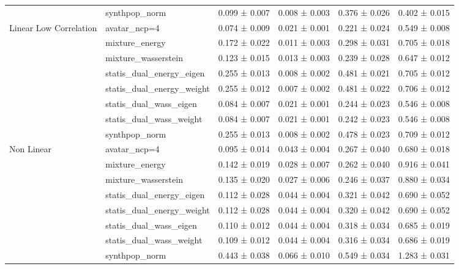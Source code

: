 \begin{tabular}{llllll}
 & synthpop_norm & \cellcolor{myred}0.099 ± 0.007 & \cellcolor{myred}0.008 ± 0.003 & \cellcolor{myred}0.376 ± 0.026 & \cellcolor{myred}0.402 ± 0.015 \\
\cline{1-6}
\multirow[t]{8}{*}{Linear 
 Low Correlation} & avatar_ncp=4 & \cellcolor{mygreen}0.074 ± 0.009 & \cellcolor{myred}0.021 ± 0.001 & \cellcolor{mygreen}0.221 ± 0.024 & 0.549 ± 0.008 \\
 & mixture_energy & 0.172 ± 0.022 & 0.011 ± 0.003 & 0.298 ± 0.031 & 0.705 ± 0.018 \\
 & mixture_wasserstein & 0.123 ± 0.015 & 0.013 ± 0.003 & 0.239 ± 0.028 & 0.647 ± 0.012 \\
 & statis_dual_energy_eigen & \cellcolor{myred}0.255 ± 0.013 & 0.008 ± 0.002 & \cellcolor{myred}0.481 ± 0.021 & 0.705 ± 0.012 \\
 & statis_dual_energy_weight & \cellcolor{myred}0.255 ± 0.012 & \cellcolor{mygreen}0.007 ± 0.002 & \cellcolor{myred}0.481 ± 0.022 & 0.706 ± 0.012 \\
 & statis_dual_wass_eigen & 0.084 ± 0.007 & \cellcolor{myred}0.021 ± 0.001 & 0.244 ± 0.023 & \cellcolor{mygreen}0.546 ± 0.008 \\
 & statis_dual_wass_weight & 0.084 ± 0.007 & \cellcolor{myred}0.021 ± 0.001 & 0.242 ± 0.023 & \cellcolor{mygreen}0.546 ± 0.008 \\
 & synthpop_norm & \cellcolor{myred}0.255 ± 0.013 & 0.008 ± 0.002 & 0.478 ± 0.023 & \cellcolor{myred}0.709 ± 0.012 \\
\cline{1-6}
\multirow[t]{8}{*}{Non Linear} & avatar_ncp=4 & \cellcolor{mygreen}0.095 ± 0.014 & 0.043 ± 0.004 & 0.267 ± 0.040 & \cellcolor{mygreen}0.680 ± 0.018 \\
 & mixture_energy & 0.142 ± 0.019 & 0.028 ± 0.007 & 0.262 ± 0.040 & 0.916 ± 0.041 \\
 & mixture_wasserstein & 0.135 ± 0.020 & \cellcolor{mygreen}0.027 ± 0.006 & \cellcolor{mygreen}0.246 ± 0.037 & 0.880 ± 0.034 \\
 & statis_dual_energy_eigen & 0.112 ± 0.028 & 0.044 ± 0.004 & 0.321 ± 0.042 & 0.690 ± 0.052 \\
 & statis_dual_energy_weight & 0.112 ± 0.028 & 0.044 ± 0.004 & 0.320 ± 0.042 & 0.690 ± 0.052 \\
 & statis_dual_wass_eigen & 0.110 ± 0.012 & 0.044 ± 0.004 & 0.318 ± 0.034 & 0.685 ± 0.019 \\
 & statis_dual_wass_weight & 0.109 ± 0.012 & 0.044 ± 0.004 & 0.316 ± 0.034 & 0.686 ± 0.019 \\
 & synthpop_norm & \cellcolor{myred}0.443 ± 0.038 & \cellcolor{myred}0.066 ± 0.010 & \cellcolor{myred}0.549 ± 0.034 & \cellcolor{myred}1.283 ± 0.031 \\
\cline{1-6}
\bottomrule
\end{tabular}
